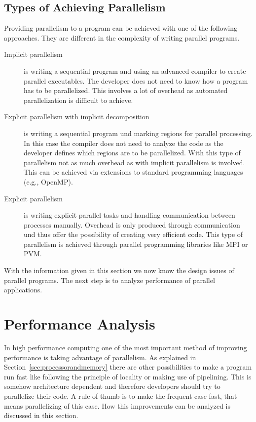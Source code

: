 \subsection{Types  of Achieving Parallelism}

Providing parallelism to a program can be achieved with one of the
following approaches. They are different in the complexity of writing
parallel programs.

\begin{description}
\item[Implicit parallelism] is writing a sequential program and using
  an advanced compiler to create parallel executables. The developer
  does not need to know how a program has to be parallelized. This
  involves a lot of overhead as automated parallelization is difficult
  to achieve.
\item[Explicit parallelism with implicit decomposition] is writing a
  sequential program und marking regions for parallel processing. In
  this case the compiler does not need to analyze the code as the
  developer defines which regions are to be parallelized. With this
  type of parallelism not as much overhead as with implicit
  parallelism is involved. This can be achieved via extensions to
  standard programming languages (e.g., OpenMP). 
\item[Explicit parallelism] is writing explicit parallel tasks and
  handling communication between processes
  manually. Overhead is only produced through communication und thus
  offer the possibility of creating very efficient code. This type of
  parallelism is achieved through parallel programming libraries like
  MPI or PVM.
\end{description}


With the information given in this section we now know the design
issues of parallel programs. The next step is to analyze performance
of parallel applications.

\section{Performance Analysis}
\label{sec:perf_analysis}

In high performance computing one of the most important method of
improving performance is taking advantage of parallelism. As explained
in Section~\ref{sec:processorandmemory} there are other possibilities
to make a program run fast like following the principle of locality
or making use of pipelining. This is somehow architecture
dependent and therefore developers should try to parallelize their
code. A rule of thumb is to make the frequent case fast, that means
parallelizing of this case. How this improvements can be analyzed is
discussed in this section.

